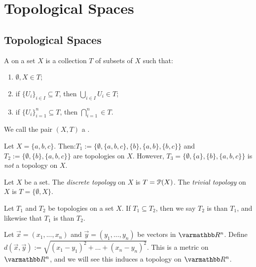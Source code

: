 \chapter{Topological Spaces}

\section{Topological Spaces}
\begin{definition}\label{def:topology}
    A  on a set $X$ is a collection $T$ of subsets of $X$ such that:
        \begin{enumerate}[label = (\arabic*),itemsep=1pt,topsep=3pt]
            \item $\emptyset, X \in T$;
            \item if $\{U_i\}_{i \in I} \subseteq T$, then $\bigcup_{i \in I}U_i \in T$;
            \item if $\{U_i\}_{i = 1}^n \subseteq T$, then $\bigcap_{i = 1}^n \in T$.
        \end{enumerate}
    We call the pair $(X,T)$ a .
\end{definition}

\begin{example}
    Let $X = \{a,b,c\}$. Then:$T_1 := \{\emptyset, \{a,b,c\},\{b\},\{a,b\},\{b,c\}\}$ and $T_2 := \{\emptyset,\{b\},\{a,b,c\}\}$ are topologies on $X$. However, $T_3 =\{\emptyset, \{a\},\{b\},\{a,b,c\}\}$ is \textit{not} a topology on $X.$
\end{example}

\begin{example}
    Let $X$ be a set. The \textit{discrete topology} on $X$ is $T = \mathcal{P}(X)$. The \textit{trivial topology} on $X$ is $T = \{\emptyset, X\}$.
\end{example}

\begin{definition}
    Let $T_1$ and $T_2$ be topologies on a set $X$. If $T_1 \subseteq T_2$, then we say $T_2$ is  than $T_1$, and likewise that $T_1$ is  than $T_2$.
\end{definition}

\begin{example}\label{example:metric-on-Rn}
    Let $\vec{x} = (x_1,...,x_n)$ and $\vec{y} = (y_1,...,y_n)$ be vectors in $\bfR^n$. Define $d(\vec{x},\vec{y}) := \sqrt{(x_1-y_1)^2 + ... + (x_n - y_n)^2}$. This is a metric on $\bfR^n$, and we will see this induces a topology on $\bfR^n$.
\end{example}

